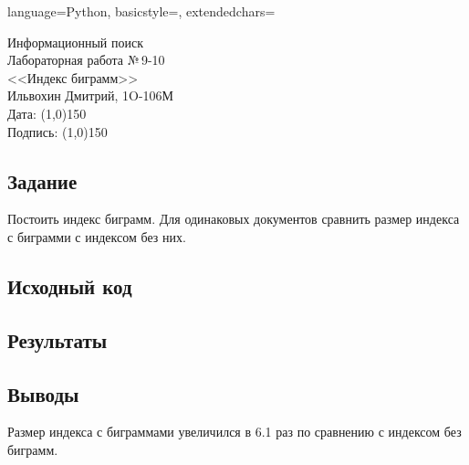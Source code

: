 \documentclass[12pt]{article}
\newcommand{\StudentName}{Ильвохин Дмитрий}
\newcommand{\Group}{1O-106М}
\newcommand{\CourseName}{Информационный поиск}
\newcommand{\LabNum}{9-10}
\newcommand{\Subject}{Индекс биграмм}
\begin{document}
\lstset
{
        language=Python,
        basicstyle=\footnotesize,%
        extendedchars=\true
}

\begin{flushright}
\Large{
	\CourseName \\
	Лабораторная работа №\,\LabNum \\
	<<\Subject>> \\
  \StudentName, \Group \\
  Дата: \line(1,0){150} \\
  Подпись: \line(1,0){150} \\
}
\end{flushright}

\subsection*{Задание}
Постоить индекс биграмм.
Для одинаковых документов сравнить размер индекса с биграмми
с индексом без них.

\subsection*{Исходный код}


\subsection*{Результаты}


\subsection*{Выводы}
Размер индекса с биграммами увеличился в 6.1 раз по сравнению
с индексом без биграмм.
\end{document}
